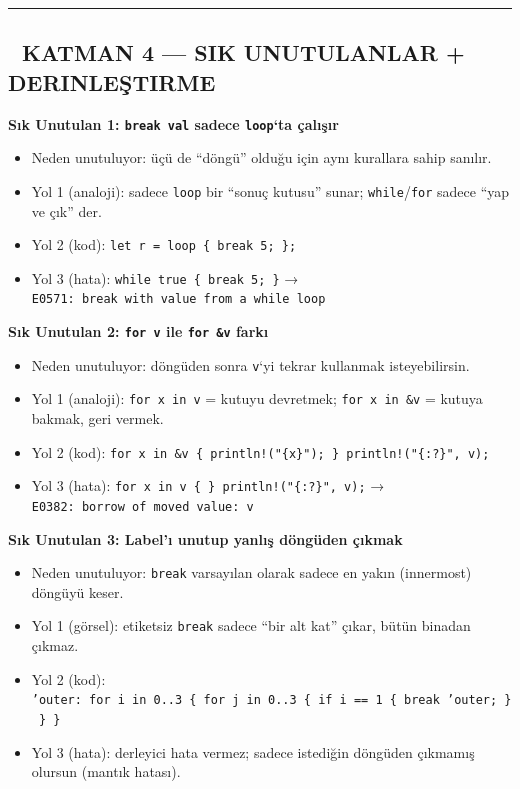 \documentclass[12pt,a4paper]{article}
\begin{document}
\begin{center}\rule{0.5\linewidth}{0.5pt}\end{center}

\subsection{🔴 KATMAN 4 --- SIK UNUTULANLAR + DERINLEŞTIRME}\label{katman-4-—-sik-unutulanlar-derinleştirme-8}

\textbf{Sık Unutulan 1: \texttt{break\ val} sadece \texttt{loop}`ta çalışır}

\begin{itemize}
\tightlist
\item
  Neden unutuluyor: üçü de ``döngü'' olduğu için aynı kurallara sahip sanılır.
\item
  Yol 1 (analoji): sadece \texttt{loop} bir ``sonuç kutusu'' sunar; \texttt{while}/\texttt{for} sadece ``yap ve çık'' der.
\item
  Yol 2 (kod): \texttt{let\ r\ =\ loop\ \{\ break\ 5;\ \};}
\item
  Yol 3 (hata): \texttt{while\ true\ \{\ break\ 5;\ \}} → \texttt{E0571:\ break\ with\ value\ from\ a\ while\ loop}
\end{itemize}

\textbf{Sık Unutulan 2: \texttt{for\ v} ile \texttt{for\ \&v} farkı}

\begin{itemize}
\tightlist
\item
  Neden unutuluyor: döngüden sonra \texttt{v}`yi tekrar kullanmak isteyebilirsin.
\item
  Yol 1 (analoji): \texttt{for\ x\ in\ v} = kutuyu devretmek; \texttt{for\ x\ in\ \&v} = kutuya bakmak, geri vermek.
\item
  Yol 2 (kod): \texttt{for\ x\ in\ \&v\ \{\ println!("\{x\}");\ \}\ println!("\{:?\}",\ v);}
\item
  Yol 3 (hata): \texttt{for\ x\ in\ v\ \{\ \}\ println!("\{:?\}",\ v);} → \texttt{E0382:\ borrow\ of\ moved\ value:\ v}
\end{itemize}

\textbf{Sık Unutulan 3: Label'ı unutup yanlış döngüden çıkmak}

\begin{itemize}
\tightlist
\item
  Neden unutuluyor: \texttt{break} varsayılan olarak sadece en yakın (innermost) döngüyü keser.
\item
  Yol 1 (görsel): etiketsiz \texttt{break} sadece ``bir alt kat'' çıkar, bütün binadan çıkmaz.
\item
  Yol 2 (kod): \texttt{'outer:\ for\ i\ in\ 0..3\ \{\ for\ j\ in\ 0..3\ \{\ if\ i\ ==\ 1\ \{\ break\ 'outer;\ \}\ \}\ \}}
\item
  Yol 3 (hata): derleyici hata vermez; sadece istediğin döngüden çıkmamış olursun (mantık hatası).
\end{itemize}
\end{document}
